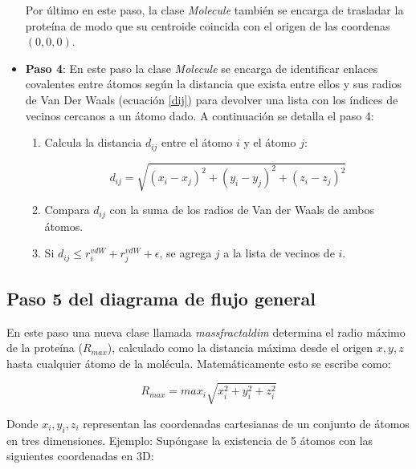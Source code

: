 \begin{itemize}
		Por último en este paso, la clase \textit{Molecule} también se encarga de trasladar 
		la proteína de modo que su centroide coincida con el origen de las coordenas \((0, 0, 0)\).  
		
		
		\item \textbf{Paso 4}: En este paso la clase \textit{Molecule} se encarga de identificar 
		enlaces covalentes entre átomos según la distancia que exista entre ellos y sus radios 
		de Van Der Waals (ecuación \ref{dij}) para devolver una lista con los índices de vecinos cercanos a un átomo dado.
		A continuación se detalla el paso 4:
				
		\begin{enumerate}
			\item Calcula la distancia \(d_{ij}\) entre el átomo \(i\) y el átomo \(j\):

			\begin{equation}
							d_{ij} = \sqrt{ (x_i - x_j)^2 + (y_i - y_j)^2 + (z_i - z_j)^2 }
							\label{dij}
			\end{equation}
			
			\item Compara \(d_{ij}\) con la suma de los radios de Van der Waals de ambos átomos.
			\item Si \(d_{ij} \leq r^{vdW}_i + r^{vdW}_j + \epsilon\), se agrega \(j\) a la lista de vecinos de \(i\).
		\end{enumerate}
		
	\end{itemize}


	\subsection{Paso 5 del diagrama de flujo general}
	
	En este paso una nueva clase llamada \textit{massfractaldim} determina el radio máximo de la 
	proteína (\(R_{max}\)), calculado como la distancia máxima desde el origen \(x, y, z\) hasta 
	cualquier átomo de la molécula. Matemáticamente esto se escribe como:
	
	\begin{equation}
		R_{max} = max_{i} \sqrt{x^{2}_{i} + y^{2}_{i} + z^{2}_{i}}
	\end{equation}
 	
 	Donde \(x_{i}, y_{i}, z_{i}\) representan las coordenadas cartesianas de un conjunto de átomos 
 	en tres dimensiones. Ejemplo: Supóngase la existencia de 5 átomos con las siguientes 
 	coordenadas en 3D:
 	
